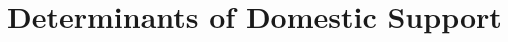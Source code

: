 \section{Determinants of Domestic Support}







\begin{comment}







Whether domestic actors support an agreement is dependent on two factors: whether actors support the terms of the agreement and whether they trust their opponent to adhere to the agreement.

Incentives

First, domestic constituencies must believe that the benefits of implementing an agreement outweigh the costs. If leaders choose to pursue

•	Compositoin of coalition
•	
•	Preferences
•	
•	Domestic institutions
•	
Interest groups affected by the policy most are particularly important for ratification 

•	Separation of powers
•	
•	Lobbying
•	
•	Important actors
•	
•	Discipline w/in governing party
•	
•	Autonomy of central decision-makers
•	
Commitment Problems

Second, domestic constituencies must believe that their opponent will adhere to the terms of an agreement. 

Additional Considerations

•	Mobilization
•	
•	Feedback Loops
•	
o	Opportunity costs of claims lead to settlement
o	
o	Settlement leads to increased trade
o	
o	Increase in trade creates feedback effects
o	
	Development in Contested Regions
	
	Joint Development Projects
	
	Development of Institutions
	
o	Trade leads to treaties \citep{espey2004}
o	
o	Threatent – espey and towfique, stinnett2009, gartzke et al 2001
o	
•	Iteration
•	
First, leaders who settle claims with important economic partners should be less likely to be punished by domestic audiences. As noted above, economic

\section{Trade and Domestic Support for Ratification and Compliance}

Although the previous chapter demonstrated that interdependent states are more likely to sign agreements, it cannot be taken for granted that they will be ratified and implemented afterwards. 

[Agreement =/= Implementation]

•	Mobilization
•	
\end{comment}
